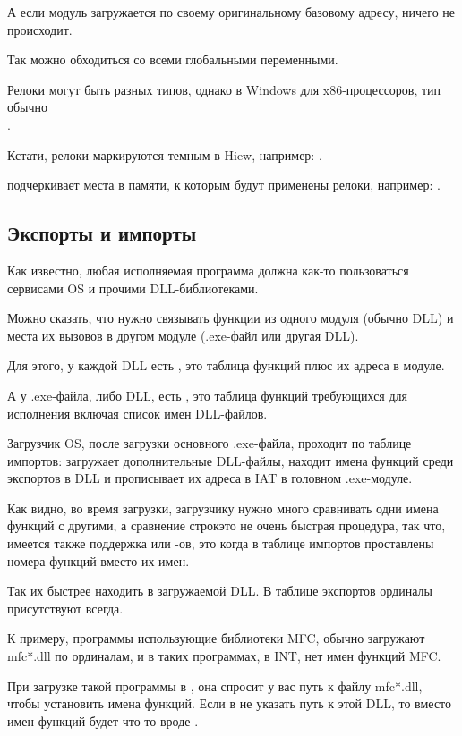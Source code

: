 А если модуль загружается по своему оригинальному базовому адресу, ничего не происходит.

Так можно обходиться со всеми глобальными переменными.

Релоки могут быть разных типов, однако в Windows для x86-процессоров, тип обычно \\
.

Кстати, релоки маркируются темным в Hiew, например: .

\myindex{\olly}
\olly подчеркивает места в памяти, к которым будут применены релоки, например: .

\subsection{Экспорты и импорты}

\label{PE_exports_imports}
Как известно, любая исполняемая программа должна как-то пользоваться сервисами \ac{OS} и прочими DLL-библиотеками.

Можно сказать, что нужно связывать функции из одного модуля (обычно DLL) и места их вызовов в другом модуле (.exe-файл или другая DLL).

Для этого, у каждой DLL есть , это таблица функций плюс их адреса в модуле.

А у .exe-файла, либо DLL, есть , это таблица функций требующихся для исполнения
включая список имен DLL-файлов.

Загрузчик \ac{OS}, после загрузки основного .exe-файла, проходит по таблице импортов:
загружает дополнительные DLL-файлы, 
находит имена функций среди экспортов в DLL и прописывает их адреса в \ac{IAT} в головном .exe-модуле.

Как видно, во время загрузки, загрузчику нужно много сравнивать одни имена функций с другими,
а сравнение строк\EMDASH{}это не очень быстрая процедура, так что,
имеется также поддержка  или
-ов, это когда в таблице импортов проставлены номера функций вместо их имен.

Так их быстрее находить в загружаемой DLL.
В таблице экспортов ординалы присутствуют всегда.

К примеру, программы использующие библиотеки \ac{MFC}, обычно загружают mfc*.dll по ординалам, и в таких программах, в \ac{INT}, нет имен функций \ac{MFC}.

При загрузке такой программы в \IDA, она спросит у вас путь к файлу mfc*.dll,
чтобы установить имена функций.
Если в \IDA не указать путь к этой DLL, то вместо имен функций будет что-то вроде .

